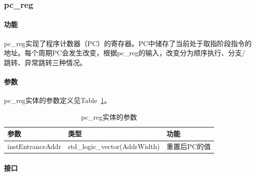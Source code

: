 \documentclass{article}
\begin{document}
\begin{spacing}{1.4}
\subsubsection{pc\_reg}

\paragraph{功能}\mbox{}

pc\_reg实现了程序计数器（PC）的寄存器。PC中储存了当前处于取指阶段指令的地址。每个周期PC会发生改变，根据pc\_reg的输入，改变分为顺序执行、分支/跳转、异常跳转三种情况。

\paragraph{参数}\mbox{}

pc\_reg实体的参数定义见Table~\ref{tb:pcreg-parameter}。
\begin{table}[!htb]
\begin{center}
\begin{tabular*}{15cm}{l|l|l}  
\hline  
\textbf{参数}&\textbf{类型}&\textbf{功能} \\
\hline instEntranceAddr        & std\_logic\_vector(AddrWidth)    & 重置后PC的值 \\
\hline 
\end{tabular*}  
\caption{pc\_reg实体的参数}
\label{tb:pcreg-parameter}
\end{center}
\end{table}

\paragraph{接口}\mbox{}


\end{spacing}
\end{document}
